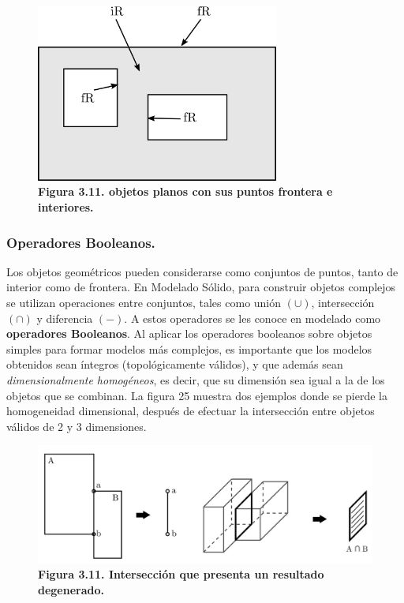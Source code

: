 \begin{figure}[h]
\includegraphics[width=8cm]{Img/GEO/geo-frontera0.jpg}
\centering
\caption{\textbf{Figura 3.11. \footnotesize{objetos planos con sus puntos frontera e interiores.}}}
\end{figure}

\subsubsection{ Operadores Booleanos. }

Los objetos geométricos pueden considerarse como conjuntos de puntos, tanto de interior como de frontera. En Modelado Sólido, para construir objetos complejos se utilizan operaciones entre conjuntos, tales como unión $(\cup)$, intersección $(\cap)$ y diferencia $(−)$. A estos operadores se les conoce en modelado como \textbf{operadores Booleanos}. Al aplicar los operadores booleanos sobre objetos simples para formar modelos más complejos, es importante que los modelos obtenidos sean íntegros (topológicamente válidos), y que además sean \textit{dimensionalmente homogéneos}, es decir, que su dimensión sea igual a la de los objetos que se combinan. La figura 25 muestra dos ejemplos donde se pierde la homogeneidad dimensional, después de efectuar la intersección entre objetos válidos de 2 y 3 dimensiones.


\begin{figure}[h]
\includegraphics[width=14cm]{Img/GEO/geo-booleano0.jpg}
\centering
\caption{\textbf{Figura 3.11. \footnotesize{Intersección que presenta un resultado degenerado.}}}
\end{figure}

